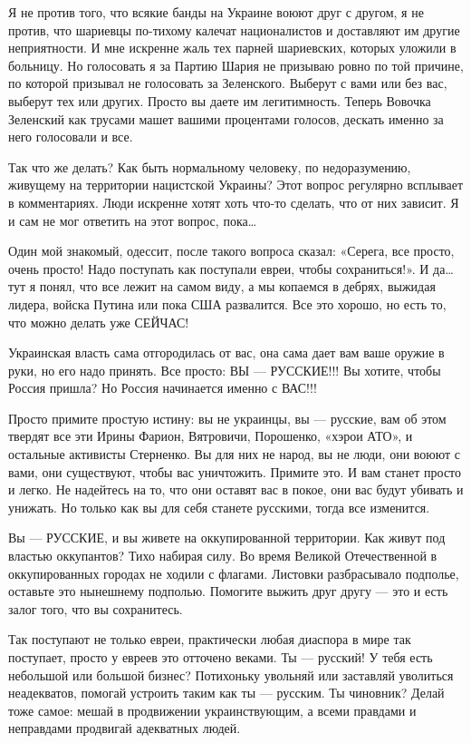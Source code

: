 \documentclass[a4paper,11pt]{extreport}
\begin{document}
Я не против того, что всякие банды на Украине воюют друг с другом, я не против,
что шариевцы по-тихому калечат националистов и доставляют им другие
неприятности. И мне искренне жаль тех парней шариевских, которых уложили в
больницу. Но голосовать я за Партию Шария не призываю ровно по той причине, по
которой призывал не голосовать за Зеленского. Выберут с вами или без вас,
выберут тех или других. Просто вы даете им легитимность. Теперь Вовочка
Зеленский как трусами машет вашими процентами голосов, дескать именно за него
голосовали и все.

Так что же делать? Как быть нормальному человеку, по недоразумению, живущему на
территории нацистской Украины? Этот вопрос регулярно всплывает в комментариях.
Люди искренне хотят хоть что-то сделать, что от них зависит. Я и сам не мог
ответить на этот вопрос, пока…

Один мой знакомый, одессит, после такого вопроса сказал: «Серега, все просто,
очень просто! Надо поступать как поступали евреи, чтобы сохраниться!». И да…
тут я понял, что все лежит на самом виду, а мы копаемся в дебрях, выжидая
лидера, войска Путина или пока США развалится. Все это хорошо, но есть то, что
можно делать уже СЕЙЧАС!

Украинская власть сама отгородилась от вас, она сама дает вам ваше оружие в
руки, но его надо принять. Все просто: ВЫ --- РУССКИЕ!!! Вы хотите, чтобы Россия
пришла? Но Россия начинается именно с ВАС!!!

Просто примите простую истину: вы не украинцы, вы --- русские, вам об этом
твердят все эти Ирины Фарион, Вятровичи, Порошенко, «хэрои АТО», и остальные
активисты Стерненко. Вы для них не народ, вы не люди, они воюют с вами, они
существуют, чтобы вас уничтожить. Примите это. И вам станет просто и легко. Не
надейтесь на то, что они оставят вас в покое, они вас будут убивать и унижать.
Но только как вы для себя станете русскими, тогда все изменится.

Вы --- РУССКИЕ, и вы живете на оккупированной территории. Как живут под властью
оккупантов? Тихо набирая силу. Во время Великой Отечественной в оккупированных
городах не ходили с флагами. Листовки разбрасывало подполье, оставьте это
нынешнему подполью. Помогите выжить друг другу --- это и есть залог того, что вы
сохранитесь.

Так поступают не только евреи, практически любая диаспора в мире так поступает,
просто у евреев это отточено веками. Ты --- русский! У тебя есть небольшой или
большой бизнес? Потихоньку увольняй или заставляй уволиться неадекватов,
помогай устроить таким как ты --- русским. Ты чиновник? Делай тоже самое: мешай в
продвижении украинствующим, а всеми правдами и неправдами продвигай адекватных
людей.
\end{document}
